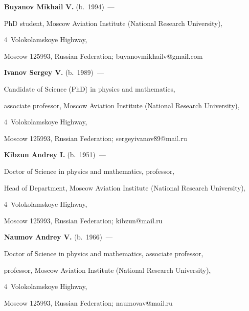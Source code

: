 \noindent


\textbf{Buyanov Mikhail V.} (b.\ 1994)~--- 


PhD student, Moscow Aviation Institute (National Research University), 


4~Volokolamskoye Highway, 


Moscow 125993, Russian Federation; \mbox{buyanovmikhailv@gmail.com}





\vspace*{3pt}





\noindent


\textbf{Ivanov Sergey V.} (b.\ 1989)~--- 


Candidate of Science (PhD) in physics and mathematics,  


associate professor, Moscow Aviation Institute (National Research University), 


4~Volokolamskoye Highway,


Moscow 125993, Russian Federation;  \mbox{sergeyivanov89@mail.ru} 








\vspace*{3pt}





\noindent


\textbf{Kibzun Andrey I.} (b.\ 1951)~--- 


Doctor of Science in physics and mathematics, professor,  


Head of Department, Moscow Aviation Institute (National Research University), 


4~Volokolamskoye Highway,


Moscow 125993, Russian Federation;  \mbox{kibzun@mail.ru} 





\vspace*{3pt}





\noindent


\textbf{Naumov Andrey V.} (b.\ 1966)~--- 


Doctor of Science in physics and mathematics, associate professor,  


professor, Moscow Aviation Institute (National Research University), 


4~Volokolamskoye Highway,


Moscow 125993, Russian Federation;  \mbox{naumovav@mail.ru} 


\label{end\stat}








\renewcommand{\bibname}{\protect\rm Литература} 


